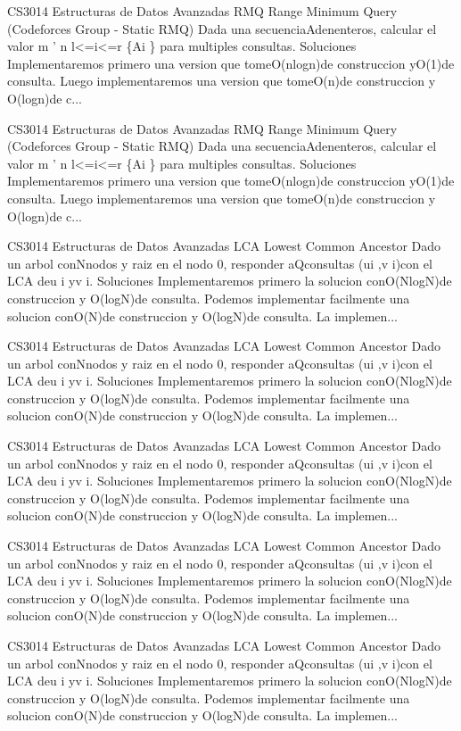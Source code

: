 \begin{description}[leftmargin=!,labelwidth=4.2em,style=nextline]
\item[Pag. 10] CS3014 Estructuras de Datos Avanzadas RMQ Range Minimum Query (Codeforces Group - Static RMQ) Dada una secuenciaAdenenteros, calcular el valor m '  n l<=i<=r \{Ai \} para multiples consultas. Soluciones Implementaremos primero una version que tomeO(nlogn)de construccion yO(1)de consulta. Luego implementaremos una version que tomeO(n)de construccion y O(logn)de c...
\item[Pag. 11] CS3014 Estructuras de Datos Avanzadas RMQ Range Minimum Query (Codeforces Group - Static RMQ) Dada una secuenciaAdenenteros, calcular el valor m '  n l<=i<=r \{Ai \} para multiples consultas. Soluciones Implementaremos primero una version que tomeO(nlogn)de construccion yO(1)de consulta. Luego implementaremos una version que tomeO(n)de construccion y O(logn)de c...
\item[Pag. 12] CS3014 Estructuras de Datos Avanzadas LCA Lowest Common Ancestor Dado un arbol conNnodos y raiz en el nodo 0, responder aQconsultas (ui ,v i)con el LCA deu i yv i. Soluciones Implementaremos primero la solucion conO(NlogN)de construccion y O(logN)de consulta. Podemos implementar facilmente una solucion conO(N)de construccion y O(logN)de consulta. La implemen...
\item[Pag. 13] CS3014 Estructuras de Datos Avanzadas LCA Lowest Common Ancestor Dado un arbol conNnodos y raiz en el nodo 0, responder aQconsultas (ui ,v i)con el LCA deu i yv i. Soluciones Implementaremos primero la solucion conO(NlogN)de construccion y O(logN)de consulta. Podemos implementar facilmente una solucion conO(N)de construccion y O(logN)de consulta. La implemen...
\item[Pag. 14] CS3014 Estructuras de Datos Avanzadas LCA Lowest Common Ancestor Dado un arbol conNnodos y raiz en el nodo 0, responder aQconsultas (ui ,v i)con el LCA deu i yv i. Soluciones Implementaremos primero la solucion conO(NlogN)de construccion y O(logN)de consulta. Podemos implementar facilmente una solucion conO(N)de construccion y O(logN)de consulta. La implemen...
\item[Pag. 15] CS3014 Estructuras de Datos Avanzadas LCA Lowest Common Ancestor Dado un arbol conNnodos y raiz en el nodo 0, responder aQconsultas (ui ,v i)con el LCA deu i yv i. Soluciones Implementaremos primero la solucion conO(NlogN)de construccion y O(logN)de consulta. Podemos implementar facilmente una solucion conO(N)de construccion y O(logN)de consulta. La implemen...
\item[Pag. 16] CS3014 Estructuras de Datos Avanzadas LCA Lowest Common Ancestor Dado un arbol conNnodos y raiz en el nodo 0, responder aQconsultas (ui ,v i)con el LCA deu i yv i. Soluciones Implementaremos primero la solucion conO(NlogN)de construccion y O(logN)de consulta. Podemos implementar facilmente una solucion conO(N)de construccion y O(logN)de consulta. La implemen...

\end{description}
